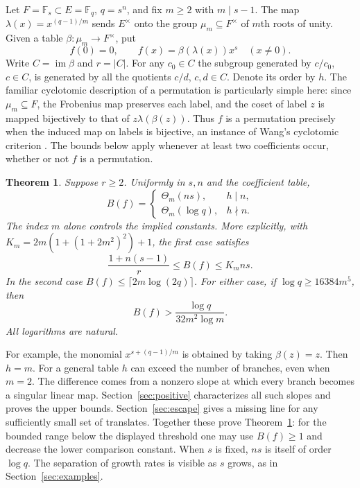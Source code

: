 \documentclass[preprint,12pt,numbers]{elsarticle}
\newtheorem{theorem}{Theorem}[section]
\begin{document}
Let $F=\mathbb F_s\subset E=\mathbb F_q$, $q=s^n$, and fix $m\ge2$ with
$m\mid s-1$. The map $\lambda(x)=x^{(q-1)/m}$ sends $E^\times$ onto
the group $\mu_m\subseteq F^\times$ of $m$th roots of unity. Given a table
$\beta:\mu_m\to F^\times$, put
\begin{equation}\label{eq:graph}
  f(0)=0,\qquad f(x)=\beta(\lambda(x))x^s\quad(x\ne0).
\end{equation}
Write $C=\operatorname{im}\beta$ and $r=|C|$. For any $c_0\in C$ the subgroup
generated by $c/c_0$, $c\in C$, is generated by all the quotients $c/d$,
$c,d\in C$. Denote its order by $h$. The familiar cyclotomic
description of a permutation \cite{BW} is particularly simple here:
since $\mu_m\subseteq F$, the Frobenius map preserves each label, and
the coset of label $z$ is mapped bijectively to that of
$z\lambda(\beta(z))$. Thus $f$ is a permutation precisely when the
induced map on labels is bijective, an instance of Wang's cyclotomic
criterion \cite{Wang}. The bounds below apply whenever
at least two coefficients occur, whether or not $f$ is a permutation.

\begin{theorem}\label{thm:main}
Suppose $r\ge2$. Uniformly in $s,n$ and the coefficient table,
\[
 B(f)=\begin{cases}
         \Theta_m(ns),&h\mid n,\\
         \Theta_m(\log q),&h\nmid n .
       \end{cases}
\]
The index $m$ alone controls the implied constants. More explicitly,
with $K_m=2m(1+(1+2m^2)^2)+1$, the first case satisfies
\[
  \frac{1+n(s-1)}{r}\le B(f)\le K_m ns.
\]
In the second case $B(f)\le\lceil2m\log(2q)\rceil$. For either case,
if $\log q\ge16384m^5$, then
\[
                 B(f)>\frac{\log q}{32m^2\log m}.
\]
All logarithms are natural.
\end{theorem}

For example, the monomial $x^{s+(q-1)/m}$ is obtained by taking
$\beta(z)=z$. Then $h=m$. For a general table $h$ can exceed the
number of branches, even when $m=2$. The difference comes from a
nonzero slope at which every branch becomes a singular linear map.
Section~\ref{sec:positive} characterizes all such slopes and proves the upper
bounds. Section~\ref{sec:escape} gives a missing line for any sufficiently
small set of translates. Together these prove Theorem~\ref{thm:main}:
for the bounded range below the displayed threshold one may use
$B(f)\ge1$ and decrease the lower comparison constant. When $s$ is fixed,
$ns$ is itself of order $\log q$. The separation of growth rates is
visible as $s$ grows, as in Section~\ref{sec:examples}.
\end{document}
